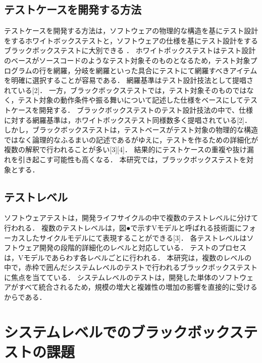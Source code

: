 \documentclass[a4paper,11pt]{jreport}
\begin{document}




\subsection{テストケースを開発する方法}
テストケースを開発する方法は，ソフトウェアの物理的な構造を基にテスト設計をするホワイトボックステストと，ソフトウェアの仕様を基にテスト設計をするブラックボックステストに大別できる\cite{myers2011art} ．
ホワイトボックステストはテスト設計のベースがソースコードのようなテスト対象そのものとなるため，テスト対象プログラムの行を網羅，分岐を網羅といった具合にテストにて網羅すべきアイテムを明確に選択することが容易である．
網羅基準はテスト設計技法として提唱されている[2]．
一方，ブラックボックステストでは，テスト対象そのものではなく，テスト対象の動作条件や振る舞いについて記述した仕様をベースにしてテストケースを開発する．
ブラックボックステストのテスト設計技法の中で、仕様に対する網羅基準は，ホワイトボックステスト同様数多く提唱されている[2]．
しかし，ブラックボックステストは，テストベースがテスト対象の物理的な構造ではなく論理的なふるまいの記述であるがゆえに，テストを作るための詳細化が複数の解釈で行われることが多い[3][4]．
結果的にテストケースの重複や抜け漏れを引き起こす可能性も高くなる．
本研究では，ブラックボックステストを対象とする．
\subsection{テストレベル}
ソフトウェアテストは，開発ライフサイクルの中で複数のテストレベルに分けて行われる．
複数のテストレベルは，図●で示すVモデルと呼ばれる技術面にフォーカスしたサイクルモデルにて表現することができる[3]．
各テストレベルはソフトウェア開発の段階的詳細化のレベルと対応している．
テストのプロセスは，Vモデルであらわす各レベルごとに行われる．
本研究は，複数のレベルの中で，赤枠で囲んだシステムレベルのテストで行われるブラックボックステストに焦点を当てている．
システムレベルのテストは，開発した単体のソフトウェアがすべて統合されるため，規模の増大と複雑性の増加の影響を直接的に受けるからである．

\section{システムレベルでのブラックボックステストの課題} \label{sec:2-2}
\end{document}

